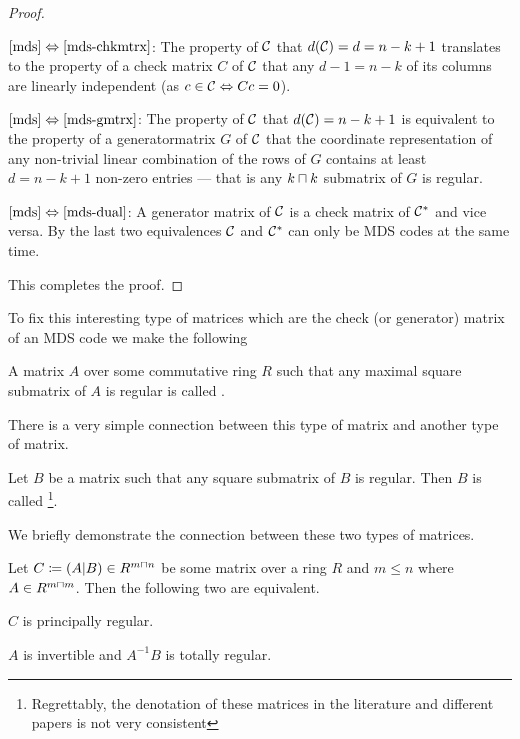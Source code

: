 \begin{proof}
    \begin{implications}
            \item[$\autoref{mds}\equival\autoref{mds-chkmtrx}$:]
        The property of $\mathcal{C}$ that $d(\mathcal{C})=d=n-k+1$ translates to the property of a check matrix $C$ of $\mathcal{C}$ that any $d-1=n-k$ of its columns are linearly independent (as $c\in\mathcal{C}\Leftrightarrow Cc=0$).
            \item[$\autoref{mds}\equival\autoref{mds-gmtrx}$:]
        The property of $\mathcal{C}$ that $d(\mathcal{C})=n-k+1$ is equivalent to the property of a generatormatrix $G$ of $\mathcal{C}$ that the coordinate representation of any non-trivial linear combination of the rows of $G$ contains at least $d=n-k+1$ non-zero entries --- that is any $k\setprod k$ submatrix of $G$ is regular.
            \item[$\autoref{mds}\equival\autoref{mds-dual}$:]
        A generator matrix of $\mathcal{C}$ is a check matrix of ${\mathcal{C}}^{\ast}$ and vice versa. By the last two equivalences $\mathcal{C}$ and ${\mathcal{C}}^{\ast}$ can only be MDS codes at the same time. 
    \end{implications}
This completes the proof.
\end{proof}

To fix this interesting type of matrices which are the check (or generator) matrix of an MDS code we make the following

\begin{definition}
    A matrix $A$ over some commutative ring $R$ such that any maximal square submatrix of $A$ is regular is called .
\end{definition}

There is a very simple connection between this type of matrix and another type of matrix.

\begin{definition}
    Let $B$ be a matrix such that any square submatrix of $B$ is regular. Then $B$ is called \footnote{Regrettably, the denotation of these matrices in the literature and different papers is not very consistent}. 
\end{definition}

We briefly demonstrate the connection between these two types of matrices.

\begin{lemma}
    Let $C\defeq(A|B)\in R^{m\setprod n}$ be some matrix over a ring $R$ and $m\leq n$ where $A\in R^{m\setprod m}$.
    Then the following two are equivalent.
    \begin{statements}
            \item $C$ is principally regular.
            \item $A$ is invertible and $A^{-1}B$ is totally regular.
    \end{statements}
\end{lemma}

